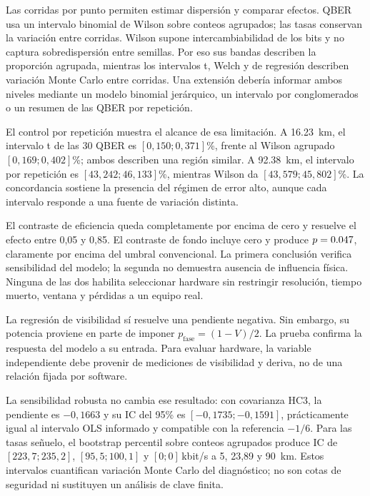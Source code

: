 Las \PThreeRepetitions{} corridas por punto permiten estimar dispersión y comparar efectos. QBER usa un intervalo binomial de Wilson sobre conteos agrupados; las tasas conservan la variación entre corridas. Wilson supone intercambiabilidad de los bits y no captura sobredispersión entre semillas. Por eso sus bandas describen la proporción agrupada, mientras los intervalos t, Welch y de regresión describen variación Monte Carlo entre corridas. Una extensión debería informar ambos niveles mediante un modelo binomial jerárquico, un intervalo por conglomerados o un resumen de las QBER por repetición.

El control por repetición muestra el alcance de esa limitación. A \SI{16.23}{\kilo\meter}, el intervalo t de las 30 QBER es \([0{,}150;0{,}371]\)\%, frente al Wilson agrupado \([0{,}169;0{,}402]\)\%; ambos describen una región similar. A \SI{92.38}{\kilo\meter}, el intervalo por repetición es \([43{,}242;46{,}133]\)\%, mientras Wilson da \([43{,}579;45{,}802]\)\%. La concordancia sostiene la presencia del régimen de error alto, aunque cada intervalo responde a una fuente de variación distinta.

El contraste de eficiencia queda completamente por encima de cero y resuelve el efecto entre 0,05 y 0,85. El contraste de fondo incluye cero y produce \(p=\num[round-mode=places,round-precision=3]{\PThreeDarkPValue}\), claramente por encima del umbral convencional. La primera conclusión verifica sensibilidad del modelo; la segunda no demuestra ausencia de influencia física. Ninguna de las dos habilita seleccionar hardware sin restringir resolución, tiempo muerto, ventana y pérdidas a un equipo real.

La regresión de visibilidad sí resuelve una pendiente negativa. Sin embargo, su potencia proviene en parte de imponer \(p_\mathrm{fase}=(1-V)/2\). La prueba confirma la respuesta del modelo a su entrada. Para evaluar hardware, la variable independiente debe provenir de mediciones de visibilidad y deriva, no de una relación fijada por software.

La sensibilidad robusta no cambia ese resultado: con covarianza HC3, la pendiente es \(-0{,}1663\) y su IC del 95\% es \([-0{,}1735;-0{,}1591]\), prácticamente igual al intervalo OLS informado y compatible con la referencia \(-1/6\). Para las tasas señuelo, el bootstrap percentil sobre conteos agrupados produce IC de \([223{,}7;235{,}2]\), \([95{,}5;100{,}1]\) y \([0;0]\)\,kbit/s a 5, 23,89 y \SI{90}{\kilo\meter}. Estos intervalos cuantifican variación Monte Carlo del diagnóstico; no son cotas de seguridad ni sustituyen un análisis de clave finita.

